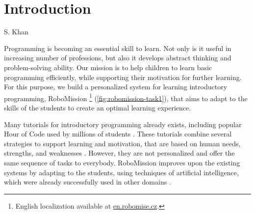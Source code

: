 \chapter{Introduction}
\label{chap:introduction}


{S. Khan}

Programming is becoming an essential skill to learn.
Not only is it useful in increasing number of professions,
but also it develops abstract thinking and problem-solving ability. %
Our mission is to help children to learn basic programming efficiently,
while supporting their motivation for further learning.
For this purpose, we build a personalized system for learning introductory
programming, RoboMission%
\footnote{English localization available at \url{en.robomise.cz}.}
(\cref{fig:robomission-task1}),
that aims to adapt to the skills of the students
to create an optimal learning experience.

Many tutorials for introductory programming already exists,
including popular Hour of Code used by millions of students \cite{hour-of-code}.
These tutorials combine several strategies to support learning and motivation,
that are based on human needs, strengths, and weaknesses
\cite{lowering-barriers}.
However, they are not personalized and offer the same sequence of tasks
to everybody.
RoboMission improves upon the existing systems by adapting to the
students, using techniques of artificial intelligence,
which were already successfully used in other domains
\cite{mathsgarden, alg.evaluation-geography, matmat.response-times}.


